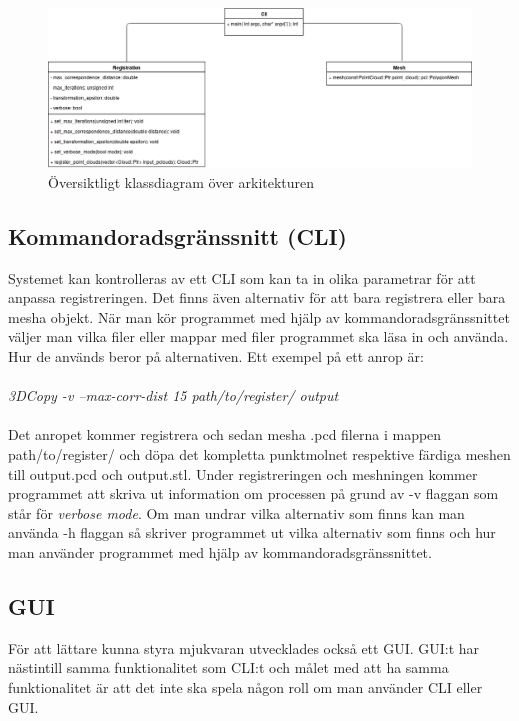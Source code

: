 \begin{figure}[H]
	\centering
	\includegraphics[width=130mm]{figures/klassdiagram.png}
	\caption{Översiktligt klassdiagram över arkitekturen}
	\label{fig:class_diagram}
\end{figure}

\subsection{Kommandoradsgränssnitt (CLI)}

Systemet kan kontrolleras av ett CLI som kan ta in olika parametrar för att anpassa registreringen. Det finns även alternativ för att bara registrera eller bara mesha objekt. När man kör programmet med hjälp av kommandoradsgränssnittet väljer man vilka filer eller mappar med filer programmet ska läsa in och använda. Hur de används beror på alternativen. Ett exempel på ett anrop är:\\\\
\textit{3DCopy -v --max-corr-dist 15 path/to/register/ output}\\\\
Det anropet kommer registrera och sedan mesha .pcd filerna i mappen path/to/register/ och döpa det kompletta punktmolnet respektive färdiga meshen till output.pcd och output.stl. Under registreringen och meshningen kommer programmet att skriva ut information om processen på grund av -v flaggan som står för \textit{verbose mode}. Om man undrar vilka alternativ som finns kan man använda -h flaggan så skriver programmet ut vilka alternativ som finns och hur man använder programmet med hjälp av kommandoradsgränssnittet. 

\subsection{GUI}
För att lättare kunna styra mjukvaran utvecklades också ett GUI. GUI:t har nästintill samma funktionalitet som CLI:t och målet med att ha samma funktionalitet är att det inte ska spela någon roll om man använder CLI eller GUI.

